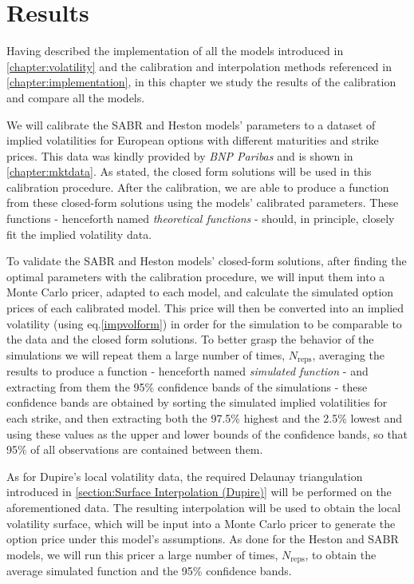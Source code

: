 \chapter{Results}
\label{chapter:results}
Having described the implementation of all the models introduced in \autoref{chapter:volatility} and the calibration and interpolation methods referenced in \autoref{chapter:implementation}, in this chapter we study the results of the calibration and compare all the models.

We will calibrate the SABR and Heston models' parameters to a dataset of implied volatilities for European options with different maturities and strike prices. This data was kindly provided by \emph{BNP Paribas} and is shown in \autoref{chapter:mktdata}. As stated, the closed form solutions will be used in this calibration procedure. After the calibration, we are able to produce a function from these closed-form solutions using the models' calibrated parameters. These functions - henceforth named \emph{theoretical functions} - should, in principle, closely fit the implied volatility data.

To validate the SABR and Heston models' closed-form solutions, after finding the optimal parameters with the calibration procedure, we will input them into a Monte Carlo pricer, adapted to each model, and calculate the simulated option prices of each calibrated model. This price will then be converted into an implied volatility (using eq.\eqref{impvolform}) in order for the simulation to be comparable to the data and the closed form solutions. To better grasp the behavior of the simulations we will repeat them a large number of times, $N_{\mathrm{reps}}$, averaging the results to produce a function - henceforth named \emph{simulated function} -  and extracting from them the 95\% confidence bands of the simulations - these confidence bands are obtained by sorting the simulated implied volatilities for each strike, and then extracting both the 97.5\% highest and the 2.5\% lowest and using these values as the upper and lower bounds of the confidence bands, so that 95\% of all observations are contained between them.



As for Dupire's local volatility data, the required Delaunay triangulation introduced in \autoref{section:Surface Interpolation (Dupire)} will be performed on the aforementioned data. The resulting interpolation will be used to obtain the local volatility surface, which will be input into a Monte Carlo pricer to generate the option price under this model's assumptions. As done for the Heston and SABR models, we will run this pricer a large number of times, $N_{\mathrm{reps}}$, to obtain the average simulated function and the 95\% confidence bands.


